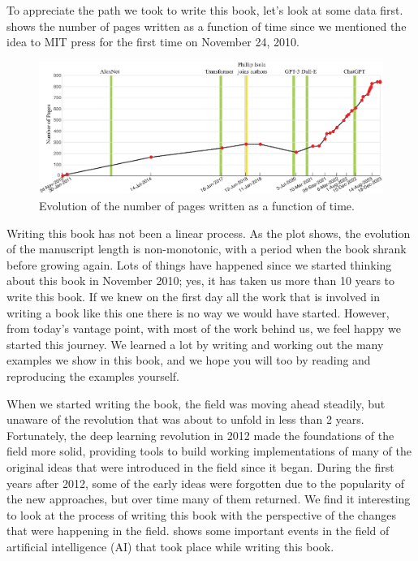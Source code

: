 To appreciate the path we took to write this book, let's look at some data first. \Fig{\ref{fig:evolution_pages}} shows the number of pages written as a function of time since we mentioned the idea to MIT press for the first time on November 24,  2010. 


\begin{figure}
\centerline{
\includegraphics[width=1\linewidth]{figures/preface/book_evolution_final.eps}
} 
\caption{Evolution of the number of pages written as a function of time. 
} 
\label{fig:evolution_pages}
\end{figure}


Writing this book has not been a linear process. As the plot shows, the evolution of the manuscript length is non-monotonic, with a period when the book shrank before growing again. Lots of things have happened since we started thinking about this book in November 2010; yes, it has taken us more than 10 years to write this book. If we knew on the first day all the work that is involved in writing a book like this one there is no way we would have started. However, from today's vantage point, with most of the work behind us, we feel happy we started this journey. We learned a lot by writing and working out the many examples we show in this book, and we hope you will too by reading and reproducing the examples yourself.

When we started writing the book, the field was moving ahead steadily, but unaware of the revolution that was about to unfold in less than 2 years. Fortunately, the deep learning revolution in 2012 made the foundations of the field more solid, providing tools to build working implementations of many of the original ideas that were introduced in the field since it began. During the first years after 2012, some of the early ideas were forgotten due to the popularity of the new approaches, but over time many of them returned. We find it interesting to look at the process of writing this book with the perspective of the changes that were happening in the field. \Fig{\ref{fig:evolution_pages}} shows some important events in the field of artificial intelligence (AI) that took place while writing this book.


